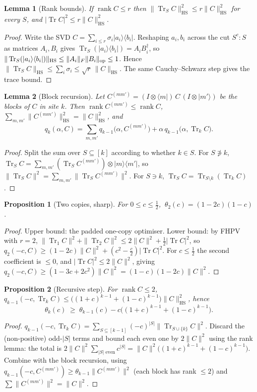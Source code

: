 \documentclass[11pt]{article}
\theoremstyle{definition}
\theoremstyle{plain}
\newtheorem{lemma}{Lemma}
\newtheorem{proposition}{Proposition}
\newcommand{\HS}{\mathrm{HS}}
\newcommand{\Tr}{\operatorname{Tr}}
\begin{document}
\begin{lemma}[Rank bounds]
If $\operatorname{rank}C\le r$ then $\|\Tr_S C\|_\HS^2\le r\|C\|_\HS^2$ for every $S$, and
$|\Tr C|^2\le r\|C\|_\HS^2$.
\end{lemma}
\begin{proof}
Write the SVD $C=\sum_{i\le r}\sigma_i|a_i\rangle\langle b_i|$. Reshaping $a_i,b_i$ across
the cut $S^c{:}S$ as matrices $A_i,B_i$ gives $\Tr_S(|a_i\rangle\langle b_i|)=A_iB_i^\dagger$,
so $\|\Tr_S(|a_i\rangle\langle b_i|)\|_\HS\le\|A_i\|_F\|B_i\|_{\rm op}\le1$. Hence
$\|\Tr_SC\|_\HS\le\sum_i\sigma_i\le\sqrt r\,\|C\|_\HS$. The same Cauchy--Schwarz step gives
the trace bound.
\end{proof}

\begin{lemma}[Block recursion]
Let $C^{(mm')}=(I\otimes\langle m|)\,C\,(I\otimes|m'\rangle)$ be the blocks of $C$ in
site $k$. Then $\operatorname{rank}C^{(mm')}\le\operatorname{rank}C$,
$\sum_{m,m'}\|C^{(mm')}\|_\HS^2=\|C\|_\HS^2$, and
\[
q_k(\alpha,C)=\sum_{m,m'}q_{k-1}\big(\alpha,C^{(mm')}\big)+\alpha\,q_{k-1}\big(\alpha,\Tr_kC\big).
\]
\end{lemma}
\begin{proof}
Split the sum over $S\subseteq[k]$ according to whether $k\in S$. For $S\not\ni k$,
$\Tr_SC=\sum_{m,m'}(\Tr_SC^{(mm')})\otimes|m\rangle\langle m'|$, so
$\|\Tr_SC\|^2=\sum_{m,m'}\|\Tr_SC^{(mm')}\|^2$. For $S\ni k$, $\Tr_SC=\Tr_{S\setminus k}(\Tr_kC)$.
\end{proof}

\begin{proposition}[Two copies, sharp]
For $0\le c\le\tfrac12$, $\ \theta_2(c)=(1-2c)(1-c)$.
\end{proposition}
\begin{proof}
Upper bound: the padded one-copy optimiser. Lower bound: by FHPV with $r=2$,
$\|\Tr_1C\|^2+\|\Tr_2C\|^2\le2\|C\|^2+\tfrac12|\Tr C|^2$, so
$q_2(-c,C)\ge(1-2c)\|C\|^2+(c^2-\tfrac c2)|\Tr C|^2$. For $c\le\tfrac12$ the second
coefficient is $\le0$, and $|\Tr C|^2\le2\|C\|^2$, giving
$q_2(-c,C)\ge(1-3c+2c^2)\|C\|^2=(1-c)(1-2c)\|C\|^2$.
\end{proof}

\begin{proposition}[Recursive step]
For $\operatorname{rank}C\le2$,
$q_{k-1}(-c,\Tr_kC)\le\big((1+c)^{k-1}+(1-c)^{k-1}\big)\|C\|_\HS^2$, hence
\[
\theta_k(c)\;\ge\;\theta_{k-1}(c)-c\big((1+c)^{k-1}+(1-c)^{k-1}\big).
\]
\end{proposition}
\begin{proof}
$q_{k-1}(-c,\Tr_kC)=\sum_{S\subseteq[k-1]}(-c)^{|S|}\|\Tr_{S\cup\{k\}}C\|^2$. Discard the
(non-positive) odd-$|S|$ terms and bound each even one by $2\|C\|^2$ using the rank lemma:
the total is $2\|C\|^2\sum_{|S|\text{ even}}c^{|S|}
=\|C\|^2\big((1+c)^{k-1}+(1-c)^{k-1}\big)$. Combine with the block recursion, using
$q_{k-1}(-c,C^{(mm')})\ge\theta_{k-1}\|C^{(mm')}\|^2$ (each block has rank $\le2$) and
$\sum\|C^{(mm')}\|^2=\|C\|^2$.
\end{proof}
\end{document}
